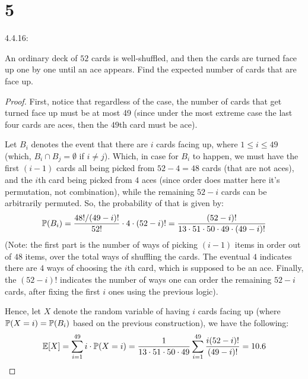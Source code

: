 \documentclass{article}
\begin{document}
\hfil

\section*{5}
\begin{ques}\label{q5}
    4.4.16:

    An ordinary deck of $52$ cards is well-shuffled, and then the cards are turned face up one by one until an ace appears. Find the expected number of cards that are face up.
\end{ques}
\begin{proof}
    First, notice that regardless of the case, the number of cards that get turned face up must be at most 49 (since under the most extreme case the last four cards are aces, then the $49$th card must be ace).

    Let $B_i$ denotes the event that there are $i$ cards facing up, where $1\leq i\leq 49$ (which, $B_i \cap B_j=\emptyset$ if $i\neq j$). Which, in case for $B_i$ to happen, we must have the first $(i-1)$ cards all being picked from $52-4=48$ cards (that are not aces), and the $i$th card being picked from $4$ aces (since order does matter here it's permutation, not combination), while the remaining $52-i$ cards can be arbitrarily permuted. So, the probability of that is given by:
    \begin{align}
        \mathbb{P}(B_i)=\frac{48!/(49-i)!}{52!}\cdot 4\cdot (52-i)! = \frac{(52-i)!}{13\cdot 51\cdot 50\cdot 49\cdot (49-i)!}
    \end{align}
    (Note: the first part is the number of ways of picking $(i-1)$ items in order out of $48$ items, over the total ways of shuffling the cards. The eventual $4$ indicates there are $4$ ways of choosing the $i$th card, which is supposed to be an ace. Finally, the $(52-i)!$ indicates the number of ways one can order the remaining $52-i$ cards, after fixing the first $i$ ones using the previous logic).

    Hence, let $X$ denote the random variable of having $i$ cards facing up (where $\mathbb{P}(X=i) = \mathbb{P}(B_i)$ based on the previous construction), we have the following:
    \begin{align}
        \mathbb{E}[X] = \sum_{i=1}^{49}i \cdot \mathbb{P}(X=i) = \frac{1}{13\cdot 51\cdot 50\cdot 49}\sum_{i=1}^{49}\frac{i(52-i)!}{(49-i)!} = 10.6
    \end{align}


\end{proof}

\hfil
\end{document}

